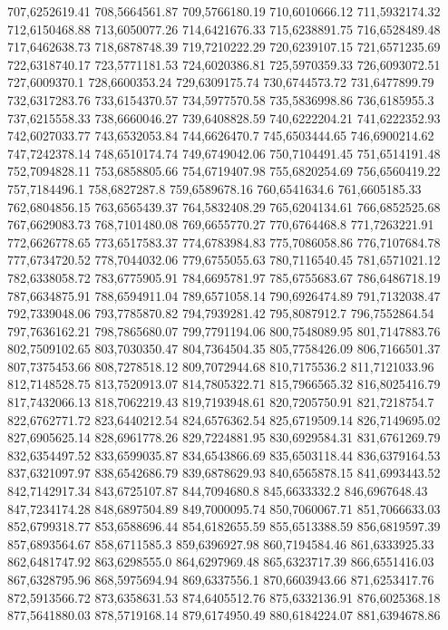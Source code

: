 707,6252619.41
708,5664561.87
709,5766180.19
710,6010666.12
711,5932174.32
712,6150468.88
713,6050077.26
714,6421676.33
715,6238891.75
716,6528489.48
717,6462638.73
718,6878748.39
719,7210222.29
720,6239107.15
721,6571235.69
722,6318740.17
723,5771181.53
724,6020386.81
725,5970359.33
726,6093072.51
727,6009370.1
728,6600353.24
729,6309175.74
730,6744573.72
731,6477899.79
732,6317283.76
733,6154370.57
734,5977570.58
735,5836998.86
736,6185955.3
737,6215558.33
738,6660046.27
739,6408828.59
740,6222204.21
741,6222352.93
742,6027033.77
743,6532053.84
744,6626470.7
745,6503444.65
746,6900214.62
747,7242378.14
748,6510174.74
749,6749042.06
750,7104491.45
751,6514191.48
752,7094828.11
753,6858805.66
754,6719407.98
755,6820254.69
756,6560419.22
757,7184496.1
758,6827287.8
759,6589678.16
760,6541634.6
761,6605185.33
762,6804856.15
763,6565439.37
764,5832408.29
765,6204134.61
766,6852525.68
767,6629083.73
768,7101480.08
769,6655770.27
770,6764468.8
771,7263221.91
772,6626778.65
773,6517583.37
774,6783984.83
775,7086058.86
776,7107684.78
777,6734720.52
778,7044032.06
779,6755055.63
780,7116540.45
781,6571021.12
782,6338058.72
783,6775905.91
784,6695781.97
785,6755683.67
786,6486718.19
787,6634875.91
788,6594911.04
789,6571058.14
790,6926474.89
791,7132038.47
792,7339048.06
793,7785870.82
794,7939281.42
795,8087912.7
796,7552864.54
797,7636162.21
798,7865680.07
799,7791194.06
800,7548089.95
801,7147883.76
802,7509102.65
803,7030350.47
804,7364504.35
805,7758426.09
806,7166501.37
807,7375453.66
808,7278518.12
809,7072944.68
810,7175536.2
811,7121033.96
812,7148528.75
813,7520913.07
814,7805322.71
815,7966565.32
816,8025416.79
817,7432066.13
818,7062219.43
819,7193948.61
820,7205750.91
821,7218754.7
822,6762771.72
823,6440212.54
824,6576362.54
825,6719509.14
826,7149695.02
827,6905625.14
828,6961778.26
829,7224881.95
830,6929584.31
831,6761269.79
832,6354497.52
833,6599035.87
834,6543866.69
835,6503118.44
836,6379164.53
837,6321097.97
838,6542686.79
839,6878629.93
840,6565878.15
841,6993443.52
842,7142917.34
843,6725107.87
844,7094680.8
845,6633332.2
846,6967648.43
847,7234174.28
848,6897504.89
849,7000095.74
850,7060067.71
851,7066633.03
852,6799318.77
853,6588696.44
854,6182655.59
855,6513388.59
856,6819597.39
857,6893564.67
858,6711585.3
859,6396927.98
860,7194584.46
861,6333925.33
862,6481747.92
863,6298555.0
864,6297969.48
865,6323717.39
866,6551416.03
867,6328795.96
868,5975694.94
869,6337556.1
870,6603943.66
871,6253417.76
872,5913566.72
873,6358631.53
874,6405512.76
875,6332136.91
876,6025368.18
877,5641880.03
878,5719168.14
879,6174950.49
880,6184224.07
881,6394678.86
